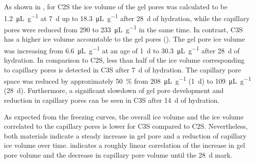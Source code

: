 As shown in , for \ac{C2S} the ice volume of the gel pores was calculated to be \qty{1.2}{\micro\liter\per\gram} at \qty{7}{\day} up to \qty{18.3}{\micro\liter\per\gram} after \qty{28}{\day} of hydration, while the capillary pores were reduced from \num{290} to \qty{233}{\micro\liter\per\gram} in the same time.
In contrast, \ac{C3S} has a higher ice volume accountable to the gel pores ().
The gel pore ice volume was increasing from \qty{6.6}{\micro\liter\per\gram} at an age of \qty{1}{\day} to \qty{30.3}{\micro\liter\per\gram} after \qty{28}{\day} of hydration.
In comparison to \ac{C2S}, less than half of the ice volume corresponding to capillary pores is detected in \ac{C3S} after \qty{7}{\day} of hydration.
The capillary pore space was reduced by approximately \qty{50}{\percent} from \qty{208}{\micro\liter\per\gram} (\qty{1}{\day}) to \qty{109}{\micro\liter\per\gram} (\qty{28}{\day}).
Furthermore, a significant slowdown of gel pore development and reduction in capillary pores can be seen in \ac{C3S} after \qty{14}{\day} of hydration.

As expected from the freezing curves, the overall ice volume and the ice volume correlated to the capillary pores is lower for \ac{C3S} compared to \ac{C2S}.
Nevertheless, both materials indicate a steady increase in gel pore and a reduction of capillary ice volume over time.
 indicates a roughly linear correlation of the increase in gel pore volume and the decrease in capillary pore volume until the \qty{28}{\day} mark.


